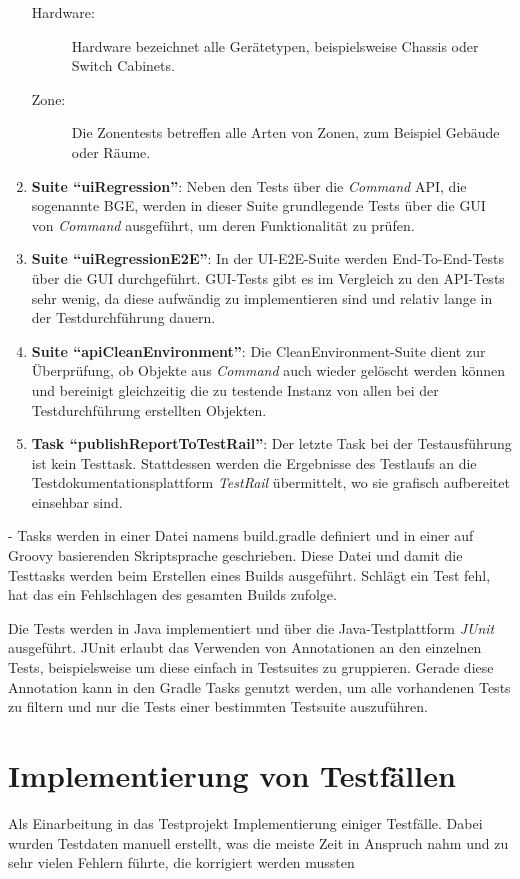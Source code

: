 \begin{enumerate}
\begin{description}
        \item[Hardware:] Hardware bezeichnet alle Gerätetypen, beispielsweise Chassis oder Switch Cabinets.
        \item[Zone:] Die Zonentests betreffen alle Arten von Zonen, zum Beispiel Gebäude oder Räume.
    \end{description}
    \item \textbf{Suite \enquote{uiRegression}}: Neben den Tests über die \textit{Command} \ac{API}, die sogenannte \ac{BGE}, werden in dieser Suite grundlegende Tests über die \ac{GUI} von \textit{Command} ausgeführt, um deren Funktionalität zu prüfen.
    \item \textbf{Suite \enquote{uiRegressionE2E}}: In der UI-E2E-Suite werden End-To-End-Tests über die \ac{GUI} durchgeführt. \ac{GUI}-Tests gibt es im Vergleich zu den \ac{API}-Tests sehr wenig, da diese aufwändig zu implementieren sind und relativ lange in der Testdurchführung dauern.
    \item \textbf{Suite \enquote{apiCleanEnvironment}}: Die CleanEnvironment-Suite dient zur Überprüfung, ob Objekte aus \textit{Command} auch wieder gelöscht werden können und bereinigt gleichzeitig die zu testende Instanz von allen bei der Testdurchführung erstellten Objekten.
    \item \textbf{Task \enquote{publishReportToTestRail}}: Der letzte Task bei der Testausführung ist kein Testtask. Stattdessen werden die Ergebnisse des Testlaufs an die Testdokumentationsplattform \textit{TestRail} übermittelt, wo sie grafisch aufbereitet einsehbar sind.
\end{enumerate}

- Tasks werden in einer Datei namens build.gradle definiert und in einer auf Groovy basierenden Skriptsprache geschrieben. Diese Datei und damit die Testtasks werden beim Erstellen eines Builds ausgeführt. Schlägt ein Test fehl, hat das ein Fehlschlagen des gesamten Builds zufolge.

Die Tests werden in Java implementiert und über die Java-Testplattform \textit{JUnit} ausgeführt. JUnit erlaubt das Verwenden von Annotationen an den einzelnen Tests, beispielsweise um diese einfach in Testsuites zu gruppieren. Gerade diese Annotation kann in den Gradle Tasks genutzt werden, um alle vorhandenen Tests zu filtern und nur die Tests einer bestimmten Testsuite auszuführen. \cite{junit:2021}

\section{Implementierung von Testfällen}\label{sec:testimplementierung}
Als Einarbeitung in das Testprojekt Implementierung einiger Testfälle. Dabei wurden Testdaten manuell erstellt, was die meiste Zeit in Anspruch nahm und zu sehr vielen Fehlern führte, die korrigiert werden mussten

